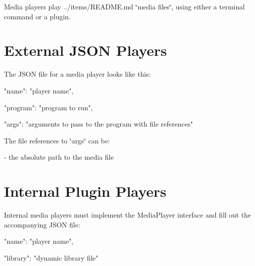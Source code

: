 Media players play ../items/\-R\-E\-A\-D\-M\-E.md \char`\"{}media files\char`\"{}, using either a terminal command or a plugin.

\section*{External J\-S\-O\-N Players}

The J\-S\-O\-N file for a media player looks like this\-: \begin{DoxyVerb}{
    "name": "player name",

    "program": "program to run",

    "args": "arguments to pass to the program with file references"
}
\end{DoxyVerb}


The file references to {\ttfamily \char`\"{}args\char`\"{}} can be\-: \begin{DoxyVerb}{1} - the absolute path to the media file
\end{DoxyVerb}


\section*{Internal Plugin Players}

Internal media players must implement the {\ttfamily Media\-Player} interface and fill out the accompanying J\-S\-O\-N file\-: \begin{DoxyVerb}{
    "name": "player name",

    "library": "dynamic library file"
} \end{DoxyVerb}
 